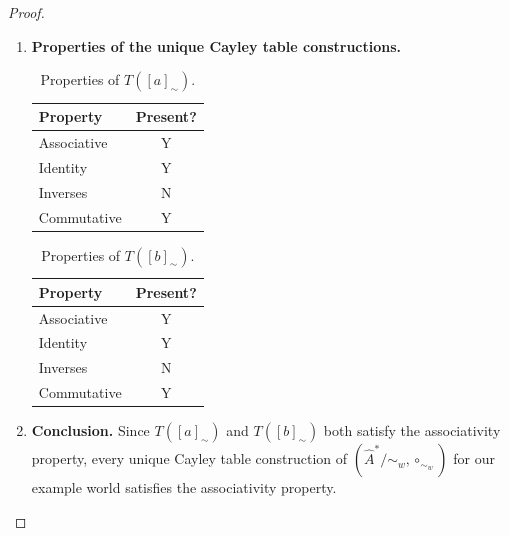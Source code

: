 \begin{proof}
\begin{enumerate}[(1)]
    \item \textbf{Properties of the unique Cayley table constructions.}
    \begin{table}[H]
        \centering
        \begin{tabular}{l|c}
        \textbf{Property} & \textbf{Present?} \\
        \hline
        Associative & Y \\
        Identity & Y \\
        Inverses & N \\
        \hline
        Commutative & Y \\
        \end{tabular}
        \caption{
        Properties of $T([a]_{\sim})$.
        }
    \end{table}
    
    \begin{table}[H]
        \centering
        \begin{tabular}{l|c}
        \textbf{Property} & \textbf{Present?} \\
        \hline
        Associative & Y \\
        Identity & Y \\
        Inverses & N \\
        \hline
        Commutative & Y \\
        \end{tabular}
        \caption{
        Properties of $T([b]_{\sim})$.
        }
    \end{table}

    \item \textbf{Conclusion.}
    Since $T([a]_{\sim})$ and $T([b]_{\sim})$ both satisfy the associativity property, every unique Cayley table construction of $(\hat{A}^{*}/\sim_{w}, \circ_{\sim_{w}})$ for our example world satisfies the associativity property.
\end{enumerate}
\end{proof}


